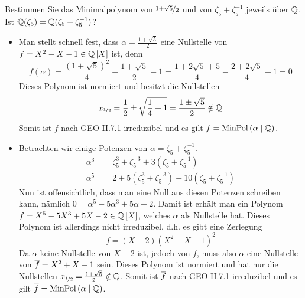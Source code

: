 \begin{exercisePage}
    \begin{exercise}
        Bestimmen Sie das Minimalpolynom von $\lfrac{1+\sqrt{5}}{2}$ und von $\zeta_5 + \zeta_5^{-1}$ jeweils über $\mathbb{Q}$. Ist $\mathbb{Q}(\zeta_5) = \mathbb{Q}(\zeta_5 + \zeta_5^{-1})$?
    \end{exercise}
    \begin{itemize}[leftmargin=*]
        \item Man stellt schnell fest, dass $\alpha = \frac{1 + \sqrt{5}}{2}$ eine Nullstelle von $f = X^2 - X -1 \in \polynom[\Q]$ ist, denn
        \begin{equation*}
            f(\alpha) = \frac{(1 + \sqrt{5})^2}{4} - \frac{1+\sqrt{5}}{2} - 1 
            = \frac{1 + 2\sqrt{5} + 5}{4} - \frac{2 + 2\sqrt{5}}{4} - 1 = 0
        \end{equation*}
        Dieses Polynom ist normiert und besitzt die Nullstellen 
        \begin{equation*}
            x_{\lfrac{1}{2}} = \frac{1}{2} \pm \sqrt{\frac{1}{4} + 1} = \frac{1 \pm \sqrt{5}}{2} \notin \Q
        \end{equation*}
        Somit ist $f$ nach GEO II.7.1 irreduzibel und es gilt $f = \operatorname{MinPol}\left( \alpha \mathrel{|} \mathbb{Q}\right)$.
        \item Betrachten wir einige Potenzen von $\alpha = \zeta_5 + \zeta_5^{-1}$.
        \begin{equation*}
            \begin{aligned}
            \alpha^3 &= \zeta_5^3 + \zeta_5^{-3} + 3(\zeta_5 + \zeta_5^{-1}) \\
            \alpha^5 &= 2 + 5(\zeta_5^3 + \zeta_5^{-3}) + 10(\zeta_5+\zeta_5^{-1})
            \end{aligned}
        \end{equation*}
        Nun ist offensichtlich, dass man eine Null aus diesen Potenzen schreiben kann, nämlich $0 = \alpha^5 - 5\alpha^3 + 5\alpha - 2$. Damit ist erhält man ein Polynom $f = X^5 - 5X^3 + 5X - 2 \in \polynom[\Q]$, welches $\alpha$ als Nullstelle hat. Dieses Polynom ist allerdings nicht irreduzibel, d.h. es gibt eine Zerlegung
        \begin{equation*}
            f = (X - 2)(X^2 + X - 1)^2
        \end{equation*}
        Da $\alpha$ keine Nullstelle von $X-2$ ist, jedoch von $f$, muss also $\alpha$ eine Nullstelle von $\overline{f} = X^2 + X -1$ sein. Dieses Polynom ist normiert und hat nur die Nullstellen $x_{\lfrac{1}{2}} = \frac{1 + \sqrt{5}}{2} \notin \Q$. Somit ist $\overline{f}$ nach GEO II.7.1 irreduzibel und es gilt $\overline{f} = \operatorname{MinPol}\left( \alpha \mathrel{|} \mathbb{Q}\right)$.

\end{itemize}
\end{exercisePage}
